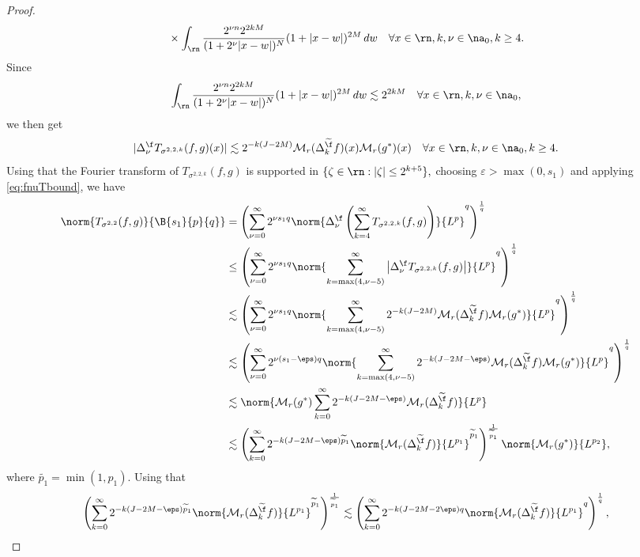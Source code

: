 \begin{proof}
\begin{align*}
&\quad \times \int_{\rn}  \frac{2^{\nu n} 2^{2kM}}{(1+ 2^\nu |x- w|)^N}(1 +  |x-w|)^{2M} \, dw\quad \forall x\in\rn,k,\nu\in\na_0, k\ge 4.
\end{align*}
Since
\begin{align*}
\int_{\rn}  \frac{2^{\nu n} 2^{2kM}}{(1+ 2^\nu |x- w|)^N}(1 +  |x-w|)^{2M} \, dw\lesssim 2^{2kM}\quad \forall x\in\rn, k,\nu\in\na_0,
\end{align*}
we then get 
\begin{equation}\label{eq:fnuTbound}
|\Delta^{\f}_\nu T_{\sigma^{2,2,k}}(f,g)(x)|\lesssim  2^{-k (J-2M)} \mathcal{M}_r(\Delta^{\widetilde{\f}}_k f)(x) \mathcal{M}_r(g^*)(x)\quad \forall x\in\rn, k,\nu\in\na_0, k\ge 4.
\end{equation}
 Using that  the Fourier transform of  $T_{\sigma^{2,2,k}}(f,g)$ is supported in $\{\zeta \in \rn: |\zeta| \leq 2^{k+5} \},$ choosing $\varepsilon>\max(0,s_1)$ and applying   \eqref{eq:fnuTbound},  we have
\begin{align*}
 \norm{T_{\sigma^{2,2}}(f,g)}{\B{s_1}{p}{q}} &=  \left(\sum\limits_{\nu =0}^\infty 2^{\nu s_1q}\norm{\Delta^{\f}_\nu \left(\sum\limits_{k=4}^\infty T_{\sigma^{2,2,k}}(f,g)\right)}{L^p}^q \right)^\frac{1}{q}\\
&\le \left(\sum\limits_{\nu =0}^{\infty}  2^{\nu  s_1 q} \norm{\sum\limits_{k=\max(4,\nu -5)}^\infty \left| \Delta^{\f}_\nu T_{\sigma^{2,2,k}}(f,g)\right|}{L^p}^q \right)^\frac{1}{q}\\
& \lesssim \left(\sum\limits_{\nu =0}^{\infty}  2^{\nu  s_1q} \norm{\sum\limits_{k=\max(4,\nu -5)}^\infty 2^{-k (J-2M)}  \mathcal{M}_r(\Delta^{\widetilde{\f}}_k f) \mathcal{M}_r(g^*)}{L^p}^q \right)^\frac{1}{q}\\
& \lesssim \left(\sum\limits_{\nu =0}^{\infty}  2^{\nu  (s_1-\eps) q} \norm{\sum\limits_{k=\max(4,\nu -5)}^\infty 2^{-k (J-2M-\eps)}  \mathcal{M}_r(\Delta^{\widetilde{\f}}_k f) \mathcal{M}_r(g^*)}{L^p}^q \right)^\frac{1}{q}\\
&\lesssim\norm{ \mathcal{M}_r(g^*) \sum\limits_{k=0}^\infty 2^{-k (J-2M-\eps)}  \mathcal{M}_r(\Delta^{\widetilde{\f}}_k f) }{L^p}\\
&\lesssim \left(\sum\limits_{k=0}^\infty 2^{-k (J-2M-\eps)\widetilde{p}_1} \norm{\mathcal{M}_r(\Delta^{\widetilde{\f}}_k f)}{L^{p_1}}^{\widetilde{p}_1} \right)^{\frac{1}{\widetilde{p}_1}}\norm{\mathcal{M}_r(g^*)}{L^{p_2}},
\end{align*}
where $\widetilde{p_1}=\min(1,p_1).$ Using that
$$
\left(\sum\limits_{k=0}^\infty 2^{-k (J-2M-\eps)\widetilde{p}_1} \norm{\mathcal{M}_r(\Delta^{\widetilde{\f}}_k f)}{L^{p_1}}^{\widetilde{p}_1} \right)^{\frac{1}{\widetilde{p}_1}}\lesssim \left( \sum\limits_{k=0}^\infty 2^{-k  (J-2M -2\eps)q} \norm{\mathcal{M}_r(\Delta^{\widetilde{\f}}_k f)}{L^{p_1}}^q  \right)^\frac{1}{q},
$$
\end{proof}
